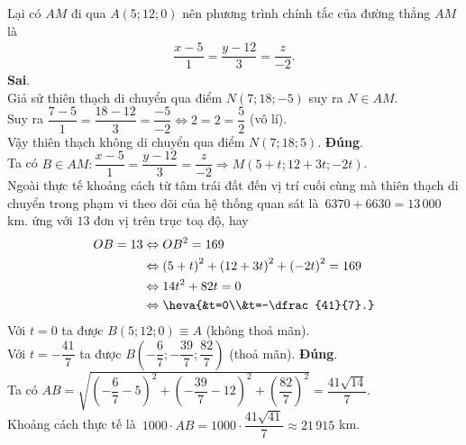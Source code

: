\begin{ex}
{\begin{itemchoice}
	Lại có $AM$ đi qua $A\left(5; 12;  0 \right)$ nên phương trình chính tắc của đường thẳng $AM$ là
	\begin{align*}
		 \dfrac{x-5}{1} = \dfrac{y-12}{3} = \dfrac{z}{-2}.
	\end{align*}
	\itemch \textbf{Sai}.\\ 
	Giả sử thiên thạch di chuyển qua điểm $N\left(7; 18; -5 \right)$  suy ra $N \in AM$.\\
	 Suy ra $\dfrac{7-5}{1} = \dfrac{18-12}{3}=\dfrac{-5}{-2} \Leftrightarrow 2 = 2 = \dfrac{5}{2}$ (vô lí).\\
	Vậy thiên thạch không di  chuyển qua điểm $N\left(7; 18; 5\right)$.
	\itemch  \textbf{Đúng}.\\
	Ta có $B \in AM \colon \dfrac{x-5}{1} = \dfrac{y-12}{3} = \dfrac{z}{-2}  \Rightarrow M\left(5+t; 12+3t; -2t \right)$.\\
	Ngoài thực tế khoảng cách từ tâm trái đất đến vị trí cuối cùng mà thiên thạch di chuyển trong phạm vi theo dõi của hệ thống quan sát là~$6370 + 6630 = 13\,000$ km. ứng với $13$ đơn vị trên trục toạ độ, hay \begin{align*}
	OB = 13 &\Leftrightarrow  OB^2 = 169\\
	&\Leftrightarrow \left(5+t \right)^2 + \left(12+3t  \right)^2 + \left(-2t \right)^2 = 169 \\
	&\Leftrightarrow 14t^2 + 82t =  0\\
	&\Leftrightarrow  \heva{&t=0\\&t=-\dfrac{41}{7}.}
\end{align*}
Với $t = 0$ ta được $B \left(5; 12; 0 \right) \equiv A$ (không  thoả mãn).\\
Với $t = -\dfrac{41}{7}$ ta được $B\left(-\dfrac{6}{7}; -\dfrac{39}{7}; \dfrac{82}{7}  \right)$ (thoả mãn).
 \itemch \textbf{Đúng}.\\
Ta có $AB = \sqrt{\left(-\dfrac{6}{7}-5 \right)^2 + \left(-\dfrac{39}{7} - 12  \right)^2 + \left(\dfrac{82}{7} \right)^2} = \dfrac{41\sqrt{14}}{7}$.\\
Khoảng  cách thực tế là~$1000 \cdot AB = 1000 \cdot \dfrac{41\sqrt{41}}{7} \approx 21\,915$ km.
\end{itemchoice}
 }
\end{ex}


